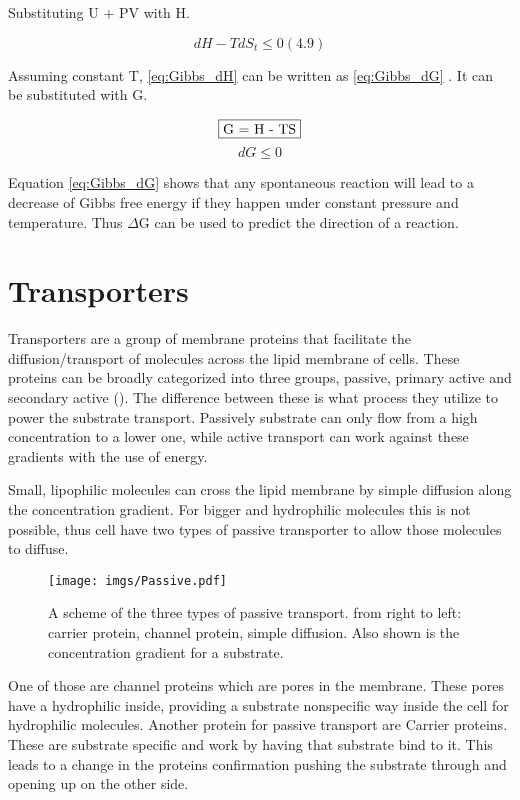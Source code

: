 Substituting U + PV with H.

\begin{equation}
    dH - TdS_t \leq 0 (4.9)
    \label{eq:Gibbs_dH}
\end{equation}

Assuming constant T, \ref{eq:Gibbs_dH} can be written as \ref{eq:Gibbs_dG} . It can be substituted with G.

\begin{equation}
    \fbox{G = H - TS}
    \label{eq:Gibbs_G}
\end{equation}
\begin{equation}
    dG \leq 0 
    \label{eq:Gibbs_dG}
\end{equation}

Equation \ref{eq:Gibbs_dG} shows that any spontaneous reaction will lead to a decrease of Gibbs free energy if they happen under constant pressure and temperature. Thus $\Delta$G can be used to predict the direction of a reaction.

\section{Transporters}
Transporters are a group of membrane proteins that facilitate the diffusion/transport of molecules across the lipid membrane of cells. These proteins can be broadly categorized into three groups, passive, primary active and secondary active (\cite{alva2020insights}). The difference between these is what process they utilize to power the substrate transport. Passively substrate can only flow from a high concentration to a lower one, while active transport can work against these gradients with the use of energy.

Small, lipophilic molecules can cross the lipid membrane by simple diffusion along the concentration gradient. For bigger and hydrophilic molecules this is not possible, thus cell have two types of passive transporter to allow those molecules to diffuse. 

\begin{figure}[H]
    \centering
    \texttt{[image: imgs/Passive.pdf]}
    \caption{A scheme of the three types of passive transport. from right to left: carrier protein, channel protein, simple diffusion. Also shown is the concentration gradient for a substrate.}
    \label{fig:Passive}
\end{figure}

One of those are channel proteins which are pores in the membrane. These pores have a hydrophilic inside, providing a substrate nonspecific way inside the cell for hydrophilic molecules. Another protein for passive transport are Carrier proteins. These are substrate specific and work by having that substrate bind to it. This leads to a change in the proteins confirmation pushing the substrate through and opening up on the other side.

